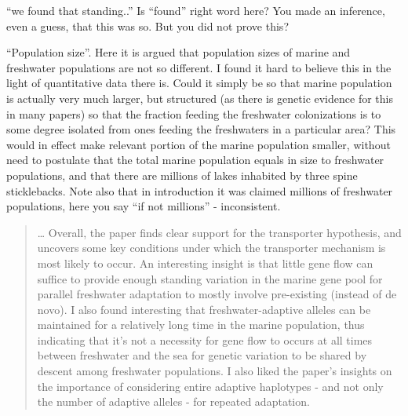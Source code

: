 \reply{
}

\begin{point}{\revref}
``we found that standing..'' Is ``found'' right word here? You made an inference, even a guess, that this was so. But you did not prove this?
\end{point}

\reply{
}

\begin{point}{\revref}
``Population size''. Here it is argued that population sizes of marine and freshwater populations are not so different. I found it hard to believe this in the light of quantitative data there is. Could it simply be so that marine population is actually very much larger, but structured (as there is genetic evidence for this in many papers) so that the fraction feeding the freshwater colonizations is to some degree isolated from ones feeding the freshwaters in a particular area? This would in effect make relevant portion of the marine population smaller, without need to postulate that the total marine population equals in size to freshwater populations, and that there are millions of lakes inhabited by three spine sticklebacks. Note also that in introduction it was claimed millions of freshwater populations, here you say ``if not millions'' - inconsistent.
\end{point}

\reply{
}





\begin{quote}
    \ldots
    Overall, the paper finds clear support for the transporter hypothesis, and
    uncovers some key conditions under which the transporter mechanism is most
    likely to occur. An interesting insight is that little gene flow can suffice to
    provide enough standing variation in the marine gene pool for parallel
    freshwater adaptation to mostly involve pre-existing (instead of de novo). I
    also found interesting that freshwater-adaptive alleles can be maintained for a
    relatively long time in the marine population, thus indicating that it's not a
    necessity for gene flow to occurs at all times between freshwater and the sea
    for genetic variation to be shared by descent among freshwater populations. I
    also liked the paper's insights on the importance of considering entire
    adaptive haplotypes - and not only the number of adaptive alleles - for
    repeated adaptation.  
\end{quote}


